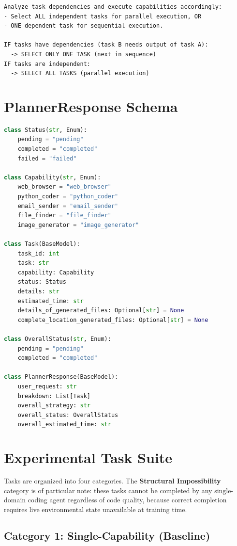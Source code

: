 \documentclass[11pt,a4paper]{article}
\begin{document}
\begin{lstlisting}
Analyze task dependencies and execute capabilities accordingly:
- Select ALL independent tasks for parallel execution, OR
- ONE dependent task for sequential execution.

IF tasks have dependencies (task B needs output of task A):
  -> SELECT ONLY ONE TASK (next in sequence)
IF tasks are independent:
  -> SELECT ALL TASKS (parallel execution)
\end{lstlisting}

\section{PlannerResponse Schema}
\label{app:schema}

\begin{lstlisting}[language=Python]
class Status(str, Enum):
    pending = "pending"
    completed = "completed"
    failed = "failed"

class Capability(str, Enum):
    web_browser = "web_browser"
    python_coder = "python_coder"
    email_sender = "email_sender"
    file_finder = "file_finder"
    image_generator = "image_generator"

class Task(BaseModel):
    task_id: int
    task: str
    capability: Capability
    status: Status
    details: str
    estimated_time: str
    details_of_generated_files: Optional[str] = None
    complete_location_generated_files: Optional[str] = None

class OverallStatus(str, Enum):
    pending = "pending"
    completed = "completed"

class PlannerResponse(BaseModel):
    user_request: str
    breakdown: List[Task]
    overall_strategy: str
    overall_status: OverallStatus
    overall_estimated_time: str
\end{lstlisting}

\section{Experimental Task Suite}
\label{app:tasks}

Tasks are organized into four categories. The \textbf{Structural Impossibility} category is of particular note: these tasks cannot be completed by any single-domain coding agent regardless of code quality, because correct completion requires live environmental state unavailable at training time.

\subsection{Category 1: Single-Capability (Baseline)}
\end{document}
